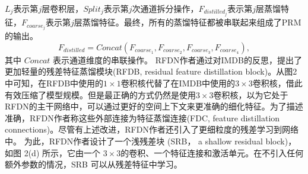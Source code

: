 \documentclass{cjc}
\begin{document}
$L_j$表示第$j$层卷积层，$Split_j$表示第$j$次通道拆分操作，$F_{distilled_j}$表示第$j$层蒸馏特征，$F_{coarse_j}$表示第$j$层蒸馏特征。最终，所有的蒸馏特征都被串联起来组成了PRM的输出。
$$
F_{distilled}=Concat(F_{coarse_1},F_{coarse_2},F_{coarse_3},F_{coarse_4}),
$$
其中 $Concat$ 表示通道维度的串联操作。
RFDN作者通过对IMDB的反思，提出了更加轻量的残差特征蒸馏模块(RFDB, residual feature distillation block)。从图2中可知，在RFDB中使用的$1\times1$卷积核代替了在IMDB中使用的$3\times3$卷积核，借此有效压缩了模型规模。但是最正确的方式仍然是使用$3\times3$卷积核，以为它处于RFDN的主干网络中，可以通过更好的空间上下文来更准确的细化特征。为了描述准确，RFDN作者称这些外部连接为特征蒸馏连接(FDC, feature distillation connections)。尽管有上述改进，RFDN作者还引入了更细粒度的残差学习到网络中。 为此，RFDN作者设计了一个浅残差块 (SRB， a shallow residual block)，如图 2(d) 所示，它由一个 $3\times3$的卷积、一个特征连接和激活单元。在不引入任何额外参数的情况，SRB 可以从残差特征中学习。

\end{document}
